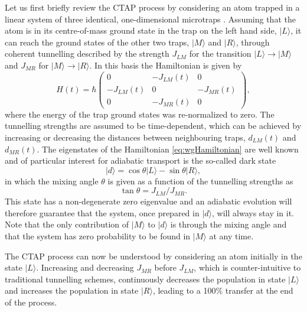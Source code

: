 Let us first briefly review the CTAP process by considering an atom trapped in a linear system of three
identical, one-dimensional microtraps \cite{Eckert:04}.  Assuming that the atom is in its centre-of-mass ground state in the trap on the left hand side,
$|L\rangle$, it can reach the ground states of the other two traps, $|M\rangle$ and $|R\rangle$, through coherent tunnelling described by the strength $J_{LM}$ for the transition $\vert L \rangle\to\vert M \rangle$ and $J_{MR}$ for $\vert M \rangle\to\vert R
\rangle$. In this basis the Hamiltonian is given by
\begin{equation}
  \label{eq:wgHamiltonian}
  H(t)=\hbar\begin{pmatrix}
                    0             & -J_{LM}(t) & 0  \\
                   -J_{LM}(t)  & 0            & -J_{MR}(t) \\
                    0             & -J_{MR}(t) & 0
  \end{pmatrix} ,
\end{equation}
where the energy of the trap ground states was re-normalized to zero. The tunnelling strengths are assumed to be time-dependent, which can be achieved by increasing or decreasing the distances between neighbouring traps, $d_{LM}(t)$ and $d_{MR}(t)$. The eigenstates of the Hamiltonian \eqref{eq:wgHamiltonian} are well known \cite{Bergmann:98} and of particular interest for adiabatic transport is the so-called dark state
\begin{equation}
  |d\rangle=\cos\theta|L\rangle-\sin\theta|R\rangle,
\end{equation}
in which the  mixing angle $\theta$ is given as a function of the tunnelling strengths as
\begin{equation}
  \tan\theta=J_{LM}/J_{MR}.
\end{equation}
This state has a non-degenerate zero eigenvalue and an adiabatic evolution will therefore guarantee that the system, once prepared in
$|d\rangle$, will always stay in it. Note that the only contribution of $|M\rangle$ to $|d\rangle$ is through the mixing angle and that the system has zero probability to be found in $|M\rangle$ at any time.

The CTAP process can now be understood by considering an atom initially in the state $|L\rangle$. Increasing and decreasing $J_{MR}$
before $J_{LM}$, which is counter-intuitive to traditional tunnelling schemes, continuously decreases the population in state $|L\rangle$
and increases the population in state $|R\rangle$, leading to a 100\% transfer at the end of the process.

